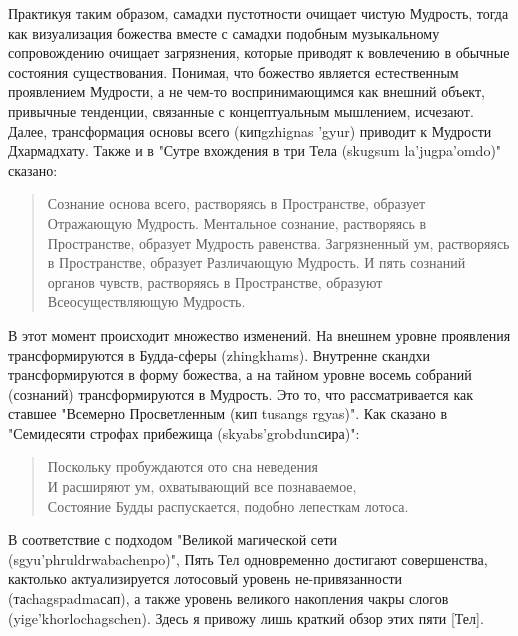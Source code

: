 Практикуя таким образом, самадхи пустотности очищает чистую Мудрость, тогда как 
визуализация божества вместе с самадхи подобным музыкальному сопровождению очищает
загрязнения, которые приводят к вовлечению в обычные состояния существования. Понимая, 
что божество является естественным проявлением Мудрости, а не чем-то
воспринимающимся как внешний объект, привычные тенденции, связанные с
концептуальным мышлением, исчезают. Далее, трансформация основы всего (кипgzhignas
’gyur) приводит к Мудрости Дхармадхату. Также и в "Сутре вхождения в три Тела (skugsum
la'jugpa’omdo)" сказано: 
\begin{verse}
Сознание основа всего, растворяясь в Пространстве, образует Отражающую
Мудрость. Ментальное сознание, растворяясь в Пространстве, образует Мудрость
равенства. Загрязненный ум, растворяясь в Пространстве, образует Различающую
Мудрость. И пять сознаний органов чувств, растворяясь в Пространстве, образуют
Всеосуществляющую Мудрость.
\end{verse}
В этот момент происходит множество изменений. На внешнем уровне проявления
трансформируются в Будда-сферы (zhingkhams). Внутренне скандхи трансформируются в 
форму божества, а на тайном уровне восемь собраний (сознаний) трансформируются в 
Мудрость. Это то, что рассматривается как ставшее "Всемерно Просветленным (кип tusangs
rgyas)". Как сказано в "Семидесяти строфах прибежища (skyabs'grobdunсира)":
\begin{verse}
Поскольку пробуждаются ото сна неведения\\
И расширяют ум, охватывающий все познаваемое,\\
Состояние Будды распускается, подобно лепесткам лотоса.
\end{verse}
В соответствие с подходом "Великой магической сети (sgyu'phruldrwabachenpo)",
Пять Тел одновременно достигают совершенства, кактолько актуализируется лотосовый
уровень не-привязанности (таchagspadmaсап), а также уровень великого накопления
чакры слогов (yige'khorlochagschen). Здесь я привожу лишь краткий обзор этих пяти [Тел].\\

